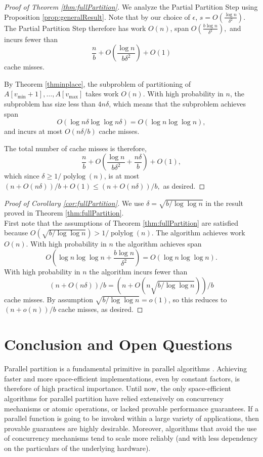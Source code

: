 \documentclass[11pt]{article}
\newcommand{\polylog}{\operatorname{polylog}}
\theoremstyle{remark}
\theoremstyle{remark}
\begin{document}
\begin{proof}[Proof of Theorem \ref{thm:fullPartition}]
  We analyze the Partial Partition Step using Proposition
  \ref{prop:generalResult}. Note that by our choice of $\epsilon$,
  $s=O\left(\frac{\log n}{\delta^2}\right)$.  The Partial Partition
  Step therefore has work $O(n)$, span $O\left(\frac{b\log
  n}{\delta^2}\right),$ and incurs fewer than
  $$\frac{n}{b}+O\left(\frac{\log n}{b\delta^2}\right)+O(1)$$ 
  cache misses.

  By Theorem \ref{thminplace}, the subproblem of partitioning of
  $A[v_{\text{min}} + 1], \ldots, A[v_{\text{max}}]$ takes work
  $O(n)$. With high probability in $n$, the subproblem has size
  less than $4n\delta$, which means that the subproblem achieves
  span $$O(\log n\delta \log\log n\delta) = O(\log n \log\log
  n),$$ and incurs at most $O(n \delta / b)$ cache misses.

  The total number of cache misses is therefore,
  $$\frac{n}{b}+O\left(\frac{\log n}{b\delta^2} +
  \frac{n\delta}{b}\right)+O(1),$$ which since $\delta \ge 1 /
  \polylog(n)$, is at most $(n+O(n\delta))/b + O(1) \le (n + O(n
  \delta)) / b,$ as desired.
\end{proof}

\begin{proof}[Proof of Corollary \ref{cor:fullPartition}] We use
  $\delta = \sqrt{b/\log\log n}$ in the result proved in Theorem
  \ref{thm:fullPartition}. \\
  First note that the assumptions of Theorem
  \ref{thm:fullPartition} are satisfied because
  $O(\sqrt{b/\log\log n}) > 1 / \polylog(n).$
  The algorithm achieves work $O(n)$. 
  With high probability in $n$ the algorithm achieves span 
  $$O\left(\log n \log\log n +\frac{b\log n}{\delta^2}\right) = O(\log n\log\log n).$$
  With high probability in $n$ the algorithm incurs fewer than 
  $$(n+O(n\delta))/b = (n+O(n\sqrt{b/\log\log n}))/b$$ 
  cache misses.
  By assumption $\sqrt{b/\log\log n} = o(1)$, so this reduces to 
  $(n+o(n))/b$
  cache misses, as desired.
\end{proof}


\section{Conclusion and Open Questions}\label{sec:open}

Parallel partition is a fundamental primitive in parallel algorithms
\cite{Blelloch96,AcarBl16}. Achieving faster and more space-efficient
implementations, even by constant factors, is therefore of high
practical importance. Until now, the only space-efficient algorithms
for parallel partition have relied extensively on concurrency
mechanisms or atomic operations, or lacked provable performance
guarantees. If a parallel function is going to be invoked within a large
variety of applications, then provable guarantees are highly
desirable. Moreover, algorithms that avoid the use of concurrency
mechanisms tend to scale more reliably (and with less dependency on
the particulars of the underlying hardware).
\end{document}
